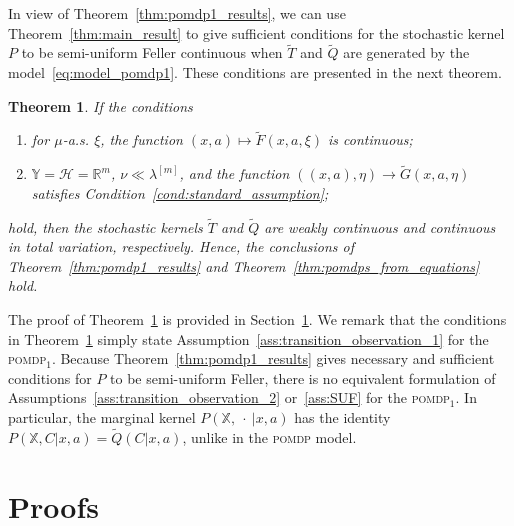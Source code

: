 \documentclass[11pt,onecolumn]{IEEEtran}  %
\newcommand{\Rb}{\mathbb{R}}
\newcommand{\Xb}{\mathbb{X}}
\newcommand{\Yb}{\mathbb{Y}}
\newcommand{\Hc}{\mathcal{H}}
\newcommand{\pomdp}{\textsc{pomdp}}
\newcommand{\pomdpOne}{\pomdp{}${}_{1}$}
\newtheorem{theorem}{Theorem}
\theoremstyle{definition}
\begin{document}
In view of Theorem~\ref{thm:pomdp1_results}, we can use Theorem~\ref{thm:main_result} to give sufficient conditions for the stochastic kernel $P$ to be semi-uniform Feller continuous when $\tilde{T}$ and $\tilde{Q}$ are generated by the model~\eqref{eq:model_pomdp1}. These conditions are presented in the next theorem.

\begin{theorem} \label{thm:pomdp1_stochastic_equations}
    If the conditions
    \begin{enumerate}
        \item for $\mu$-a.s. $\xi$, the function $(x,a) \mapsto \tilde{F}(x,a,\xi)$ is continuous;
        \item $\Yb=\Hc=\Rb^m$, $\nu \ll \lambda^{[m]}$, and the function $((x,a), \eta) \to \tilde{G}(x,a,\eta)$ satisfies Condition~\ref{cond:standard_assumption};
    \end{enumerate}
    hold, then the stochastic kernels $\tilde{T}$ and $\tilde{Q}$ are weakly continuous and continuous in total variation, respectively. Hence, the conclusions of Theorem~\ref{thm:pomdp1_results} and Theorem~\ref{thm:pomdps_from_equations} hold.
\end{theorem}

The proof of Theorem~\ref{thm:pomdp1_stochastic_equations} is provided in Section~\ref{sec:proofs}. We remark that the conditions in Theorem~\ref{thm:pomdp1_stochastic_equations} simply state Assumption~\ref{ass:transition_observation_1} for the \pomdpOne{}. Because Theorem~\ref{thm:pomdp1_results} gives necessary and sufficient conditions for $P$ to be semi-uniform Feller, there is no equivalent formulation of Assumptions~\ref{ass:transition_observation_2} or~\ref{ass:SUF} for the \pomdpOne{}. In particular, the marginal kernel $P(\Xb,\:\cdot\:|x,a)$ has the identity $P(\Xb,C|x,a) = \tilde{Q}(C|x,a)$, unlike in the \pomdp{} model.

\section{Proofs}\label{sec:proofs}
\end{document}
